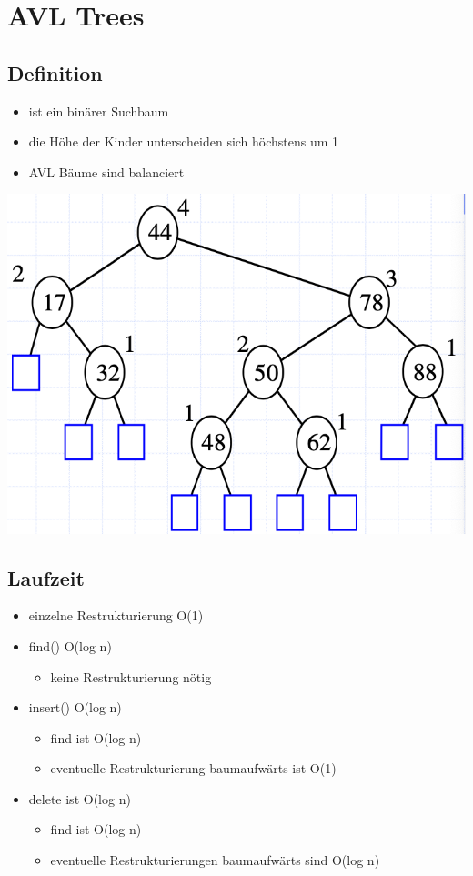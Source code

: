 \section{AVL Trees}
\subsection{Definition}
\begin{itemize}
    \item ist ein binärer Suchbaum
    \item die Höhe der Kinder unterscheiden sich höchstens um 1
    \item AVL Bäume sind balanciert
\end{itemize}

\begin{center}
    \includegraphics[scale=.25]{graphic/02 AVLTrees/definition.png}
\end{center}


\subsection{Laufzeit}
\begin{itemize}
    \item einzelne Restrukturierung O(1)
    \item find() O(log n)
    \begin{itemize}
        \item keine Restrukturierung nötig
    \end{itemize}
    \item insert() O(log n)
    \begin{itemize}
        \item find ist O(log n)
        \item eventuelle Restrukturierung baumaufwärts ist O(1)
    \end{itemize}
    \item delete ist O(log n)
    \begin{itemize}
        \item find ist O(log n)
        \item eventuelle Restrukturierungen baumaufwärts sind O(log n)
    \end{itemize}
\end{itemize}


